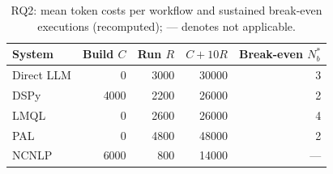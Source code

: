 \begin{table}[!htbp]
\centering
\caption{RQ2: mean token costs per workflow and sustained break-even executions (recomputed); --- denotes not applicable.}
\label{tab:rq2-cost}
\footnotesize\setlength{\tabcolsep}{3pt}
\begin{tabular*}{\linewidth}{@{\extracolsep{\fill}}lrrrr@{}}
\toprule
System & Build $C$ & Run $R$ & $C+10R$ & Break-even $N_b^*$ \\
\midrule
Direct LLM & 0 & 3000 & 30000 & 3 \\
DSPy & 4000 & 2200 & 26000 & 2 \\
LMQL & 0 & 2600 & 26000 & 4 \\
PAL & 0 & 4800 & 48000 & 2 \\
NCNLP & 6000 & 800 & 14000 & --- \\
\bottomrule
\end{tabular*}
\end{table}
